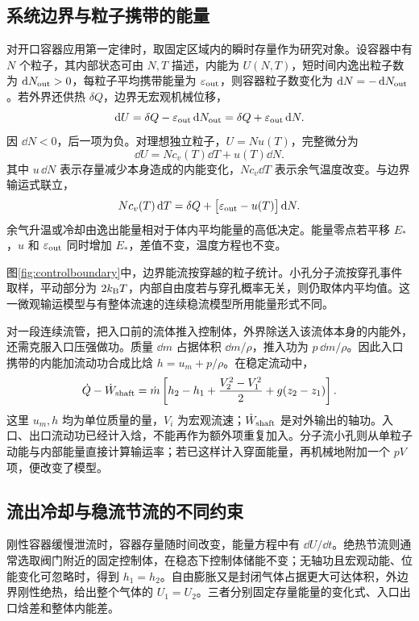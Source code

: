 \subsection{系统边界与粒子携带的能量}
\label{th:openboundary}
对开口容器应用第一定律时，取固定区域内的瞬时存量作为研究对象。设容器中有 $N$ 个粒子，其内部状态可由 $N,T$ 描述，内能为 $U(N,T)$，短时间内逸出粒子数为 $\mathop{}\!\mathrm d N_{\rm out}>0$，每粒子平均携带能量为 $\varepsilon_{\rm out}$，则容器粒子数变化为 $\mathop{}\!\mathrm d N=-\mathop{}\!\mathrm d N_{\rm out}$。若外界还供热 $\delta Q$，边界无宏观机械位移，
\[
 \mathop{}\!\mathrm d U=\delta Q-\varepsilon_{\rm out}\mathop{}\!\mathrm d N_{\rm out}
 =\delta Q+\varepsilon_{\rm out}\mathop{}\!\mathrm d N.
\]
因 $\dd N<0$，后一项为负。对理想独立粒子，$U=Nu(T)$，完整微分为
\[
 \dd U=Nc_v(T)\dd T+u(T)\dd N.
\]
其中 $u\,\dd N$ 表示存量减少本身造成的内能变化，$Nc_v\dd T$ 表示余气温度改变。与边界输运式联立，
\[
 Nc_v(T)\mathop{}\!\mathrm d T
 =\delta Q+\bigl[\varepsilon_{\rm out}-u(T)\bigr]\mathop{}\!\mathrm d N.
\]
余气升温或冷却由逸出能量相对于体内平均能量的高低决定。能量零点若平移 $E_\ast$，$u$ 和 $\varepsilon_{\rm out}$ 同时增加 $E_\ast$，差值不变，温度方程也不变。

图\ref{fig:controlboundary}中，边界能流按穿越的粒子统计。小孔分子流按穿孔事件取样，平动部分为 $2k_{\mathrm B} T$，内部自由度若与穿孔概率无关，则仍取体内平均值。这一微观输运模型与有整体流速的连续稳流模型所用能量形式不同。

对一段连续流管，把入口前的流体推入控制体，外界除送入该流体本身的内能外，还需克服入口压强做功。质量 $\dd m$ 占据体积 $\dd m/\rho$，推入功为 $p\,\dd m/\rho$。因此入口携带的内能加流动功合成比焓 $h=u_m+p/\rho$。在稳定流动中，
\[
 \dot Q-\dot W_{\rm shaft}
 =\dot m\left[
 h_2-h_1+\frac{V_2^2-V_1^2}{2}
 +g(z_2-z_1)\right].
\]
这里 $u_m,h$ 均为单位质量的量，$V_i$ 为宏观流速；$\dot W_{\rm shaft}$ 是对外输出的轴功。入口、出口流动功已经计入焓，不能再作为额外项重复加入。分子流小孔则从单粒子动能与内部能量直接计算输运率；若已这样计入穿面能量，再机械地附加一个 $pV$ 项，便改变了模型。

\subsection{流出冷却与稳流节流的不同约束}
刚性容器缓慢泄流时，容器存量随时间改变，能量方程中有 $\dd U/\dd t$。绝热节流则通常选取阀门附近的固定控制体，在稳态下控制体储能不变；无轴功且宏观动能、位能变化可忽略时，得到 $h_1=h_2$。自由膨胀又是封闭气体占据更大可达体积，外边界刚性绝热，给出整个气体的 $U_1=U_2$。三者分别固定存量能量的变化式、入口出口焓差和整体内能差。


